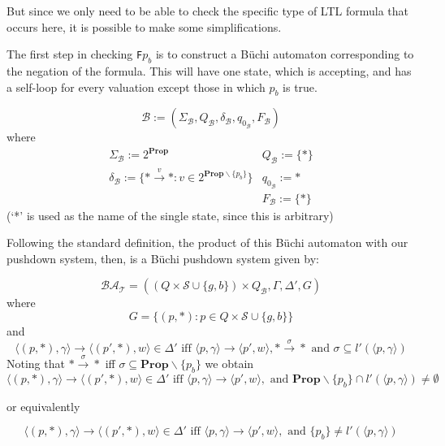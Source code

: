 \documentclass[11pt]{article}
\theoremstyle{definition}
\begin{document}
But since we only need to be able to check the specific type of LTL formula
that occurs here, it is possible to make some simplifications.

The first step in checking \texttt{F}$p_b$ is to construct a B\"{u}chi
automaton corresponding to the negation of the formula. This will have one
state, which is accepting, and has a self-loop for every valuation except those
in which $p_b$ is true. 

\[ 
\mathcal{B} := (\Sigma_\mathcal{B}, Q_\mathcal{B}, \delta_\mathcal{B}, q_{0_\mathcal{B}}, F_\mathcal{B})
\]
where
\begin{displaymath}
     \begin{array}{cc}
     \Sigma_\mathcal{B} := 2^{\textbf{Prop}}                        
     & Q_\mathcal{B} := \{ * \} \\
     \delta_\mathcal{B} := \{ * \xrightarrow{v} * : v \in 2^{\textbf{Prop}\backslash\{p_b\}}  \}
     & q_{0_\mathcal{B}} := * \\
        & F_\mathcal{B} := \{*\}
   \end{array}
\end{displaymath}
(`*' is used as the name of the single state, since this is arbitrary)


Following the standard definition\cite{EHRS00b}, the product of this B\"{u}chi automaton with our pushdown system, then, is a B\"{u}chi pushdown system given by:

\[ 
\mathcal{BA_T} = ( (Q \times \mathcal{S} \cup \{g, b\}) \times Q_\mathcal{B}, \Gamma, \Delta', G) 
\]
where
\[ G = \{ (p, *) : p \in Q \times \mathcal{S} \cup \{g, b\} \} \]
and 
\[ \langle (p, *), \gamma \rangle \rightarrow \langle (p', *), w\rangle \in \Delta' 
\text{ iff } \langle p, \gamma \rangle \rightarrow \langle p', w \rangle, *
\xrightarrow{\sigma} *\text{ and }\sigma \subseteq l'(\langle p, \gamma
\rangle) \]
Noting that $* \xrightarrow{\sigma} *$ iff $\sigma \subseteq \textbf{Prop}\backslash\{p_b\}$ we obtain 
\[ \langle (p, *), \gamma \rangle \rightarrow \langle (p', *), w\rangle \in \Delta' 
\text{ iff } \langle p, \gamma \rangle \rightarrow \langle p', w \rangle,\text{ and } \textbf{Prop}\backslash\{p_b\} \cap l'(\langle p, \gamma
\rangle) \neq \emptyset\]

or equivalently

\[ \langle (p, *), \gamma \rangle \rightarrow \langle (p', *), w\rangle \in \Delta' 
\text{ iff } \langle p, \gamma \rangle \rightarrow \langle p', w \rangle,\text{ and } \{ p_b \} \neq l'(\langle p, \gamma \rangle) \]
\end{document}
